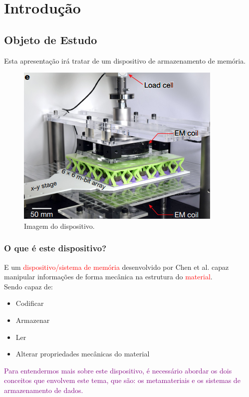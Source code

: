 \section{Introdução}

\subsection{Objeto de Estudo}
Esta apresentação irá tratar de um dispositivo de armazenamento de memória.

    \begin{figure}[H]
        \centering
        \includegraphics[scale = 0.5]{source/pictures/device.png}
        \caption{Imagem do dispositivo\cite{chen2021reprogrammable}.}
        \label{fig:device}
    \end{figure}

\subsubsection{O que é este dispositivo?}
    E um \textcolor{red}{dispositivo/sistema de memória} desenvolvido por Chen et al. capaz manipular informações de forma mecânica na estrutura do \textcolor{red}{material}\cite{coulais2021snappy}.\\ 

    Sendo capaz de:

    \begin{itemize}
        \item Codificar
        \item Armazenar
        \item Ler
        \item Alterar propriedades mecânicas do material
    \end{itemize}

    \textcolor{purple}{Para entendermos mais sobre este dispositivo, é necessário abordar os dois conceitos que envolvem este tema, que são: os metamateriais e os sistemas de armazenamento de dados. }

